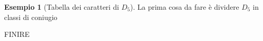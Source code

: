 \documentclass[11pt]{article}
\theoremstyle{plain}
\theoremstyle{definition}
\newtheorem{exmp}{Esempio}[section]
\theoremstyle{remark}
\begin{document}
\begin{exmp}[Tabella dei caratteri di $D_5$]

La prima cosa da fare è dividere $D_5$ in classi di coniugio


FINIRE



















\end{exmp}
\end{document}
